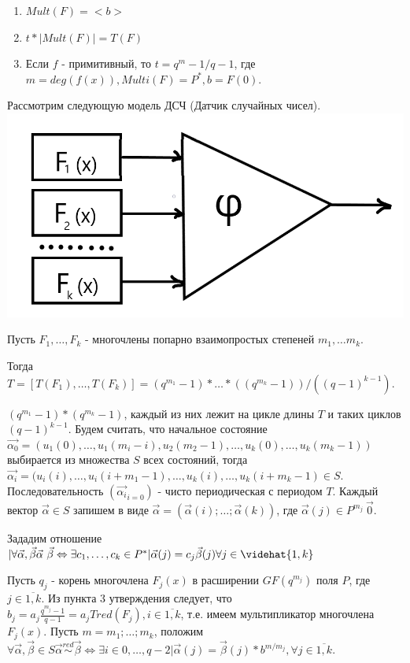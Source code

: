 \begin{enumerate}
\item $Mult(F) = <b>$
\item $t * |Mult(F)|=T(F)$
\item  Если $f$ - примитивный, то $t= {q^m - 1}/{q-1}$, где $m=deg(f(x)), Multi(F)=P^*, b=F(0)$.
\end{enumerate}

Рассмотрим следующую модель ДСЧ (Датчик случайных чисел).\\

\includegraphics[scale=0.35]{DSC}

Пусть $F_1, \dots, F_k$ - многочлены попарно взаимопростых степеней $m_1, \dots m_k$.

Тогда $T=[T(F_1), \dots, T(F_k)] = (q^{m_1} - 1) * \dots * ((q^{m_k} - 1))/((q-1)^{k-1})$.

$(q^{m_1} - 1) * (q^{m_k} - 1)$, каждый из них лежит на цикле длины $T$ и таких циклов $(q-1)^{k-1}$. Будем считать, что начальное состояние $\vec{\alpha_0} = (u_1(0), \dots, u_1(m_i - i), u_2(m_2-1), \dots, u_k(0), \dots, u_k(m_k-1))$ выбирается из множества $S$ всех состояний, тогда $\vec{\alpha_i}=(u_i(i), \dots, u_i(i+m_1-1), \dots, u_k(i), \dots, u_k(i+m_k-1) \in S$.
 Последовательность $(\vec{\alpha_i}_{i=0})$ - чисто периодическая с периодом $T$.
Каждый вектор $\vec{\alpha} \in S$ запишем в виде $\vec{\alpha} = (\vec{\alpha}(i); \dots; \vec{\alpha}(k))$, где $\vec{\alpha}(j) \in P^{m_j} \ {\vec{0}}$.

Зададим отношение ~ $|\forall \vec{\alpha}, \vec{\beta} \vec{\alpha}~\vec{\beta} \Leftrightarrow \exists c_1, \dots, c_k \in P^*|\vec{\alpha}(j) = c_j \vec{\beta}(j) \forall j \in \videhat{1,k}$

Пусть $q_j$ - корень многочлена $F_j(x)$ в расширении $GF(q^{m_j})$ поля $P$, где $j \in \overline{1,k}$. Из пункта 3 утверждения следует, что $b_j = a_j \frac{q^{m_j}-1}{q-1} = a_j Tred(F_j), i \in \overline{1,k}$, т.е. имеем мультипликатор многочлена $F_j(x)$. Пусть $m=m_1; \dots; m_k$, положим $\forall \vec{\alpha}, \vec{\beta} \in S  \vec{\alpha} \stackrel{red}{\sim} \vec{\beta} \Leftrightarrow \exists i \in {0, \dots, q-2} | \vec{\alpha}(j) = \vec{\beta}(j) * b^{m/m_j}, \forall j \in \overline{1,k}$.

